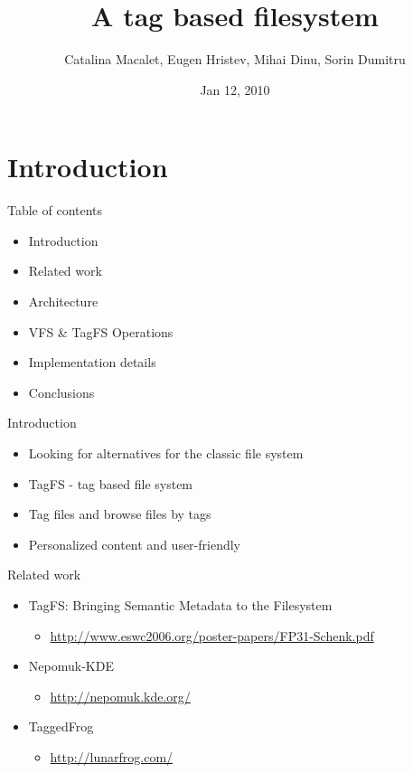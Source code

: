 \documentclass{beamer}
\title[TagFS]{A tag based filesystem}
\author{Catalina Macalet, Eugen Hristev, Mihai Dinu, Sorin Dumitru}
\institute{Politehnic University of Bucharest}
\date{Jan 12, 2010}
\begin{document}
\begin{frame}
  \titlepage
\end{frame}

\section{Introduction}
\begin{frame}{Table of contents}
    \begin{itemize}
        \item{Introduction}
        \item{Related work}
	\item{Architecture}
	\item{VFS \& TagFS Operations}
	\item{Implementation details}
	\item{Conclusions}
    \end{itemize}
\end{frame}

\begin{frame}{Introduction}
    \begin{itemize}
        \item{Looking for alternatives for the classic file system}
        \item{TagFS - tag based file system}
	\item{Tag files and browse files by tags}
        \item{Personalized content and user-friendly}
    \end{itemize}
\end{frame}

\begin{frame}{Related work}
    \begin{itemize}
        \item{TagFS: Bringing Semantic Metadata to the Filesystem}
	\begin{itemize}
		\item \url{http://www.eswc2006.org/poster-papers/FP31-Schenk.pdf}
	\end{itemize}
        \item{Nepomuk-KDE}
	\begin{itemize}
		\item \url{http://nepomuk.kde.org/}
	\end{itemize}
	\item{TaggedFrog}
	\begin{itemize}
		\item \url{http://lunarfrog.com/}
	\end{itemize}
    \end{itemize}
\end{frame}
\end{document}
